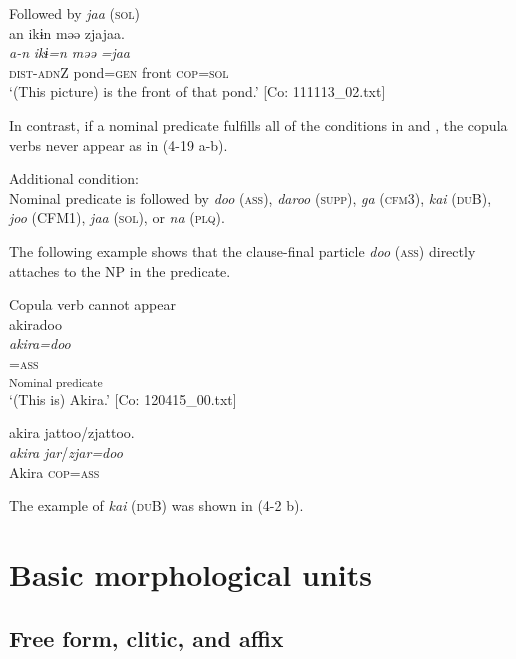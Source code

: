 \ea  Followed by \textit{jaa} (\textsc{sol}) \label{ex:4.17}\\
\glll  an  ikɨn  məə  zjajaa.\\
    \textit{a-n}  \textit{ikɨ=n}  \textit{məə}  \textit{=jaa}\\
    \textsc{dist}-\textsc{adn}Z  pond=\textsc{gen}  front  \textsc{cop}=\textsc{sol}\\
    \glt     ‘(This picture) is the front of that pond.’ [Co: 111113\_02.txt]
\z

  In contrast, if a nominal predicate fulfills all of the conditions in  and , the copula verbs never appear as in (4-19 a-b).

\ea  Additional condition: \label{ex:4.18}\\
  Nominal predicate is followed by \textit{doo} (\textsc{ass}), \textit{daroo} (\textsc{supp}), \textit{ga} (\textsc{cfm}3), \textit{kai} (\textsc{du}B), \textit{joo} (CFM1), \textit{jaa} (\textsc{sol}), or \textit{na} (\textsc{plq}).
\z

The following example shows that the clause-final particle \textit{doo} (\textsc{ass}) directly attaches to the NP in the predicate.

\ea  Copula verb cannot appear \label{ex:4.19}
\ea{}\\
\gllll   akiradoo\\
      \textit{akira=doo}\\
      [Akira]=\textsc{ass}\\
      [NP]\textsubscript{Nominal predicate}\\
      \glt       ‘(This is) Akira.’ [Co: 120415\_00.txt]

\ex  %
\glll *akira  jattoo/zjattoo.\\
      \textit{akira}  \textit{jar}/\textit{zjar=doo}\\
      Akira  \textsc{cop}=\textsc{ass}\\
\glt    [El: 111104]
\z
\z

The example of \textit{kai} (\textsc{du}B) was shown in (4-2 b).

\section{Basic morphological units}\label{sec:4.2}
\subsection{Free form, clitic, and affix}\label{sec:4.2.1}

